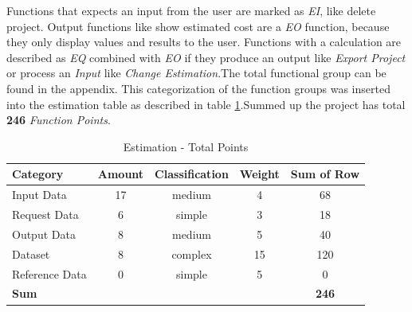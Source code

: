 Functions that expects an input from the user are marked as \textit{EI}, like delete project. Output functions like show estimated cost are a \textit{EO} function, because they only display values and results to the user. Functions with a calculation are described as \textit{EQ} combined with \textit{EO} if they produce an output like \textit{Export Project} or process an \textit{Input} like \textit{Change Estimation}.The total functional group can be found in the appendix. This categorization of the function groups was inserted into the estimation table as described in table \ref{estimation:data}.Summed up the project has total \textbf{246} \textit{Function Points}.
\begin{table}[h]
	\centering 
	\setlength{\tabcolsep}{4pt}
	\begin{tabular}{|l|c|c|c|c|}\hline
		Category		&  Amount 		&  Classification	&  Weight 	& Sum of Row\\ \hline
		Input Data   	& 17      		& medium  			& 4			& 68	\\ \hline
		Request Data   	& 6      		& simple  			& 3			& 18	\\ \hline
		Output Data   	& 8      		& medium  			& 5			& 40	\\ \hline
		Dataset   		& 8      		& complex  			& 15		& 120	\\ \hline
		Reference Data  & 0      		& simple  			& 5			& 0	\\ \hline
		\textbf{Sum}   			&       		&   				& 			& \textbf{246}	\\ \hline
	\end{tabular} 
	\caption{Estimation - Total Points} 
	\label{estimation:data} 
\end{table}\\
